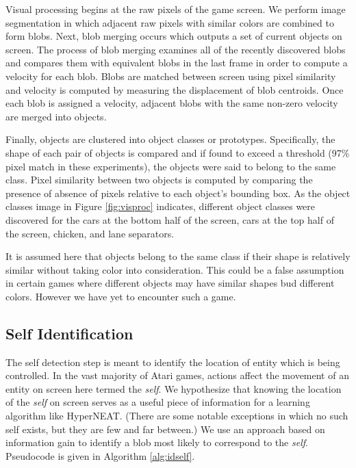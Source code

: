 \documentclass{acm_proc_article-sp}
\begin{document}
Visual processing begins at the raw pixels of the game screen. We perform image segmentation in which adjacent raw pixels with similar colors are combined to form blobs. Next, blob merging occurs which outputs a set of current objects on screen. The process of blob merging examines all of the recently discovered blobs and compares them with equivalent blobs in the last frame in order to compute a velocity for each blob. Blobs are matched between screen using pixel similarity and velocity is computed by measuring the displacement of blob centroids. Once each blob is assigned a velocity, adjacent blobs with the same non-zero velocity are merged into objects. 

Finally, objects are clustered into object classes or prototypes. Specifically, the shape of each pair of objects is compared and if found to exceed a threshold (97\% pixel match in these experiments), the objects were said to belong to the same class. Pixel similarity between two objects is computed by comparing the presence of absence of pixels relative to each object's bounding box. As the object classes image in Figure \ref{fig:visproc} indicates, different object classes were discovered for the cars at the bottom half of the screen, cars at the top half of the screen, chicken, and lane separators. 

It is assumed here that objects belong to the same class if their shape is relatively similar without taking color into consideration. This could be a false assumption in certain games where different objects may have similar shapes bud different colors. However we have yet to encounter such a game.

\subsection{Self Identification}
The self detection step is meant to identify the location of entity which is being controlled. In the vast majority of Atari games, actions affect the movement of an entity on screen here termed the \textit{self}. We hypothesize that knowing the location of the \textit{self} on screen serves as a useful piece of information for a learning algorithm like HyperNEAT. (There are some notable exceptions in which no such self exists, but they are few and far between.) We use an approach based on information gain to identify a blob most likely to correspond to the \textit{self}. Pseudocode is given in Algorithm \ref{alg:idself}.
\end{document}

